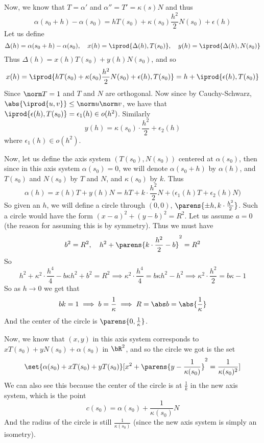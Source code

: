     \item Now, we know that $T=\alpha'$ and $\alpha''=T'=\kappa(s)N$ and thus
    \[ \alpha(s_0+h) - \alpha(s_0) = hT(s_0) + \kappa(s_0)\frac{h^2}2N(s_0) + \epsilon(h) \]
    Let us define
    \[ \Delta(h) = \alpha(s_0+h) - \alpha(s_0),\quad x(h) = \iprod{\Delta(h), T(s_0)},\quad y(h) = \iprod{\Delta(h), N(s_0)} \]
    Thus $\Delta(h)=x(h)T(s_0) + y(h)N(s_0)$, and so
    \[ x(h) = \iprod{hT(s_0) + \kappa(s_0)\frac{h^2}2N(s_0) + \epsilon(h), T(s_0)} = h + \iprod{\epsilon(h), T(s_0)} \]
    Since $\norm T=1$ and $T$ and $N$ are orthogonal.
    Now since by Cauchy-Schwarz, $\abs{\iprod{u,v}}\leq\norm u\norm v$, we have that $\iprod{\epsilon(h), T(s_0)}=\epsilon_1(h)\in o(h^2)$.
    Similarly
    \[ y(h) = \kappa(s_0)\cdot\frac{h^2}2 + \epsilon_2(h) \]
    where $\epsilon_1(h)\in o(h^2)$.

    \item Now, let us define the axis system $(T(s_0),N(s_0))$ centered at $\alpha(s_0)$, then since in this axis system $\alpha(s_0)=0$, we will denote $\alpha(s_0+h)$ by $\alpha(h)$, and $T(s_0)$ and
    $N(s_0)$ by $T$ and $N$, and $\kappa(s_0)$ by $k$.
    Thus
    \[ \alpha(h) = x(h)T + y(h)N = hT + k\cdot\frac{h^2}2N + \bigl(\epsilon_1(h)T + \epsilon_2(h)N\bigr) \]
    So given an $h$, we will define a circle through $(0,0)$, $\parens{\pm h,k\cdot\frac{h^2}2}$.
    Such a circle would have the form $(x-a)^2+(y-b)^2=R^2$.
    Let us assume $a=0$ (the reason for assuming this is by symmetry).
    Thus we must have
    \[ b^2 = R^2,\quad h^2 + \parens{k\cdot\frac{h^2}2-b}^2 = R^2 \]
    So
    \[ h^2 + \kappa^2\cdot\frac{h^4}4 - b\kappa h^2+ b^2 = R^2 \implies \kappa^2\cdot\frac{h^4}4 = b\kappa h^2 - h^2 \implies \kappa^2\cdot\frac{h^2}2 = b\kappa - 1 \]
    So as $h\to0$ we get that
    \[ bk = 1 \implies b=\frac1\kappa \implies R=\abs b=\abs{\frac1\kappa} \]
    And the center of the circle is $\parens{0,\frac1\kappa}$.

    \item Now, we know that $(x,y)$ in this axis system corresponds to $xT(s_0)+yN(s_0)+\alpha(s_0)$ in $\bR^2$, and so the circle we got is the set
    \[ \set{\alpha(s_0)+xT(s_0)+yT(s_0)}[x^2+\parens{y-\frac1{\kappa(s_0)}}^2=\frac1{\kappa(s_0)^2}] \]
    We can also see this because the center of the circle is at $\frac1k$ in the new axis system, which is the point
    \[ c(s_0) = \alpha(s_0) + \frac1{\kappa(s_0)}N \]
    And the radius of the circle is still $\frac1{\kappa(s_0)}$ (since the new axis system is simply an isometry).
\eenum

